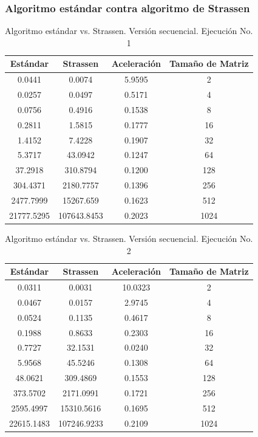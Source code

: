 \documentclass{article}
\begin{document}
\clearpage

\subsubsection{Algoritmo estándar contra algoritmo de Strassen}

\begin{table}[ht]
\centering
\begin{tabular}{|c|c|c|c|}
\hline
\textbf{Estándar} & \textbf{Strassen} & \textbf{Aceleración} & \textbf{Tamaño de Matriz} \\
\hline
0.0441 & 0.0074 & 5.9595 & 2 \\
0.0257 & 0.0497 & 0.5171 & 4 \\
0.0756 & 0.4916 & 0.1538 & 8 \\
0.2811 & 1.5815 & 0.1777 & 16 \\
1.4152 & 7.4228 & 0.1907 & 32 \\
5.3717 & 43.0942 & 0.1247 & 64 \\
37.2918 & 310.8794 & 0.1200 & 128 \\
304.4371 & 2180.7757 & 0.1396 & 256 \\
2477.7999 & 15267.659 & 0.1623 & 512 \\
21777.5295 & 107643.8453 & 0.2023 & 1024 \\
\hline
\end{tabular}
\caption{Algoritmo estándar vs. Strassen. Versión secuencial. Ejecución No. 1}
\end{table}


\begin{table}[ht]
\centering
\begin{tabular}{|c|c|c|c|}
\hline
\textbf{Estándar} & \textbf{Strassen} & \textbf{Aceleración} & \textbf{Tamaño de Matriz} \\
\hline
0.0311 & 0.0031 & 10.0323 & 2 \\
0.0467 & 0.0157 & 2.9745 & 4 \\
0.0524 & 0.1135 & 0.4617 & 8 \\
0.1988 & 0.8633 & 0.2303 & 16 \\
0.7727 & 32.1531 & 0.0240 & 32 \\
5.9568 & 45.5246 & 0.1308 & 64 \\
48.0621 & 309.4869 & 0.1553 & 128 \\
373.5702 & 2171.0991 & 0.1721 & 256 \\
2595.4997 & 15310.5616 & 0.1695 & 512 \\
22615.1483 & 107246.9233 & 0.2109 & 1024 \\
\hline
\end{tabular}
\caption{Algoritmo estándar vs. Strassen. Versión secuencial. Ejecución No. 2}
\end{table}
\end{document}
